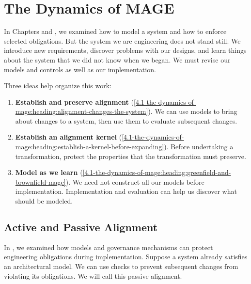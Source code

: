 


\chapter{The Dynamics of MAGE}

In Chapters  and , we examined how to model a system and how to enforce selected obligations. But the system we are engineering does not stand still. We introduce new requirements, discover problems with our designs, and learn things about the system that we did not know when we began. We must revise our models and controls as well as our implementation.

Three ideas help organize this work:

\begin{enumerate}
\item \textbf{Establish and preserve alignment} (\cref{4.1-the-dynamics-of-mage:heading:alignment-changes-the-system}). We can use models to bring about changes to a system, then use them to evaluate subsequent changes.
\item \textbf{Establish an alignment kernel} (\cref{4.1-the-dynamics-of-mage:heading:establish-a-kernel-before-expanding}). Before undertaking a transformation, protect the properties that the transformation must preserve.
\item \textbf{Model as we learn} (\cref{4.1-the-dynamics-of-mage:heading:greenfield-and-brownfield-mage}). We need not construct all our models before implementation. Implementation and evaluation can help us discover what should be modeled.
\end{enumerate}

\section{Active and Passive Alignment}\label{heading:alignment-changes-the-system}


In , we examined how models and governance mechanisms can protect engineering obligations during implementation. Suppose a system already satisfies an architectural model. We can use checks to prevent subsequent changes from violating its obligations. We will call this passive alignment.

